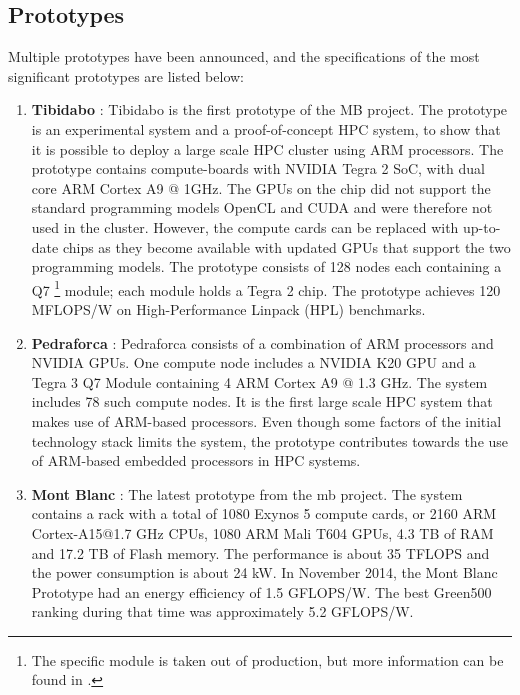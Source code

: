 \subsection{Prototypes}
\label{sub-sec:mb-prot}
Multiple prototypes have been announced, and the specifications of the most significant prototypes are listed below:
\begin{enumerate}
\item \textbf{Tibidabo} \cite{a:MB:Tib}: Tibidabo is the first prototype of the MB project. The prototype is an experimental system and a proof-of-concept HPC system, to show that it is possible to deploy a large scale HPC cluster using ARM processors. The prototype contains compute-boards with NVIDIA Tegra 2 SoC, with dual core ARM Cortex A9 @ 1GHz. The GPUs on the chip did not support the standard programming models OpenCL and CUDA and were therefore not used in the cluster. However, the compute cards can be replaced with up-to-date chips as they become available with updated GPUs that support the two programming models. The prototype consists of 128 nodes each containing a Q7 \footnote{The specific module is taken out of production, but more information can be found in \cite{a:MB:Tib}.} module; each module holds a Tegra 2 chip. The prototype achieves 120 MFLOPS/W on High-Performance Linpack (HPL) benchmarks.
\item \textbf{Pedraforca} \cite{p:MB:Pedr}: Pedraforca consists of a combination of ARM processors and NVIDIA GPUs. One compute node includes a NVIDIA K20 GPU and a Tegra 3 Q7 Module containing 4 ARM Cortex A9 @ 1.3 GHz. The system includes 78 such compute nodes. It is the first large scale HPC system that makes use of ARM-based processors. Even though some factors of the initial technology stack limits the system, the prototype contributes towards the use of ARM-based embedded processors in HPC systems.
\item \textbf{Mont Blanc} \cite{p:MB:MB-prot, p:MB-15}: The latest prototype from the \gls{mb} project. The system contains a rack with a total of 1080 Exynos 5 compute cards, or 2160 ARM Cortex-A15@1.7 GHz CPUs, 1080 ARM Mali T604 GPUs, 4.3 TB of RAM and 17.2 TB of Flash memory. The performance is about 35 TFLOPS and the power consumption is about 24 kW. In November 2014, the Mont Blanc Prototype had an energy efficiency of 1.5 GFLOPS/W. The best Green500 ranking during that time was approximately 5.2 GFLOPS/W.
\end{enumerate}

